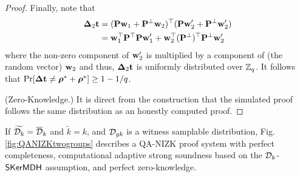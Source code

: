 \begin{proof}
Finally, note that
\begin{align*}
\mathbf{{\Delta}}_2\mathbf{t} &=(\mathbf{{P}}\mathbf{w}_1+\mathbf{{P^\perp}}\mathbf{w}_2)^\top(\mathbf{{P}}\mathbf{w}'_2+\mathbf{{P^\perp}}\mathbf{w}'_2)\\
&= \mathbf{w}_1^\top\mathbf{{P}}^\top\mathbf{{P}}\mathbf{w}'_1+\mathbf{w}_2^\top(\mathbf{{P}}^\perp)^\top\mathbf{{P^\perp}}\mathbf{w}'_2
\end{align*}
where the non-zero component of $\mathbf{w}'_2$ is multiplied by a component of (the random vector) $\mathbf{w}_2$ and thus, $\mathbf{{\Delta}}_2\mathbf{t}$ is uniformly distributed over $\mathbb{Z}_q$. It follows that $\Pr[\mathbf{{\Delta}}\mathbf{t}\neq{\boldsymbol \rho}^*+{\boldsymbol \rho}^*]\geq 1- 1/q$.

(Zero-Knowledge.) It is direct from the construction that the simulated proof follows the same distribution as an honestly computed proof.
\end{proof}


\begin{theorem} If $\widetilde{\mathcal{D}_{k}}=\overline{\mathcal{D}}_k$ and $\tilde{k}=k$,  and $\mathcal{D}_{gk}$ is a witness samplable distribution, Fig. \ref{fig:QANIZKtwogroups}
describes a QA-NIZK proof system with perfect completeness, computational adaptive strong soundness based on the  $\mathcal{D}_{k}$-$\mathsf{SKerMDH}$ assumption, and perfect zero-knowledge. 
\label{theo:membtwogroups2}
\end{theorem}


